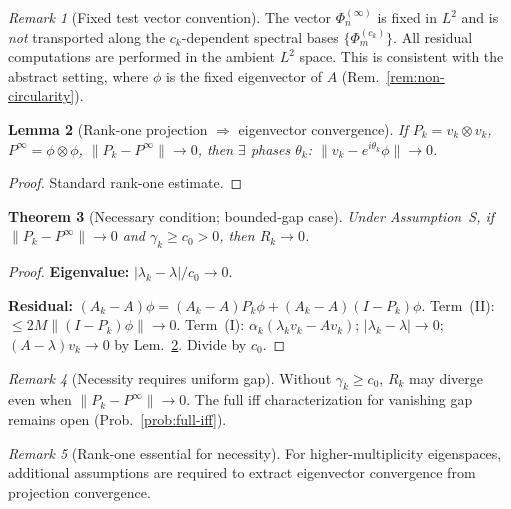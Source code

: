 \documentclass[12pt,a4paper]{amsart}
\newtheorem{theorem}{Theorem}[section]
\newtheorem{lemma}[theorem]{Lemma}
\theoremstyle{definition}
\theoremstyle{remark}
\newtheorem{remark}[theorem]{Remark}
\begin{document}
\begin{remark}[Fixed test vector
  convention]
\label{rem:fixed-test-vector}
The vector $\Phi_n^{(\infty)}$ is
fixed in $L^2$ and is \emph{not}
transported along the $c_k$-dependent
spectral bases $\{\Phi_m^{(c_k)}\}$.
All residual computations are
performed in the ambient $L^2$ space.
This is consistent with the abstract
setting, where $\phi$ is the fixed
eigenvector of $A$
(Rem.~\ref{rem:non-circularity}).
\end{remark}

\begin{lemma}[Rank-one projection
  $\Rightarrow$ eigenvector convergence]
\label{lem:rank-one-proj}
If $P_k=v_k\otimes v_k$,
$P^\infty=\phi\otimes\phi$,
$\|P_k-P^\infty\|\to 0$, then
$\exists$ phases $\theta_k$:
$\|v_k-e^{i\theta_k}\phi\|\to 0$.
\end{lemma}
\begin{proof}
Standard rank-one estimate.
\end{proof}

\begin{theorem}[Necessary condition;
  bounded-gap case]
\label{thm:necessary-bounded-gap}
Under Assumption~S, if
$\|P_k-P^\infty\|\to 0$ and
$\gamma_k\ge c_0>0$,
then $R_k\to 0$.
\end{theorem}
\begin{proof}
\textbf{Eigenvalue:}
$|\lambda_k-\lambda|/c_0\to 0$.

\textbf{Residual:}
$(A_k-A)\phi
=(A_k-A)P_k\phi
+(A_k-A)(I-P_k)\phi$.
Term~(II):
$\le 2M\|(I-P_k)\phi\|\to 0$.
Term~(I): $\alpha_k(\lambda_kv_k-Av_k)$;
$|\lambda_k-\lambda|\to 0$;
$(A-\lambda)v_k\to 0$ by
Lem.~\ref{lem:rank-one-proj}.
Divide by $c_0$.
\end{proof}

\begin{remark}[Necessity requires
  uniform gap]
\label{rem:necessity-uniform-gap}
Without $\gamma_k\ge c_0$, $R_k$
may diverge even when
$\|P_k-P^\infty\|\to 0$.
The full iff characterization
for vanishing gap remains open
(Prob.~\ref{prob:full-iff}).
\end{remark}

\begin{remark}[Rank-one essential
  for necessity]
\label{rem:rank-one-essential}
For higher-multiplicity eigenspaces,
additional assumptions are required
to extract eigenvector convergence
from projection convergence.
\end{remark}
\end{document}
